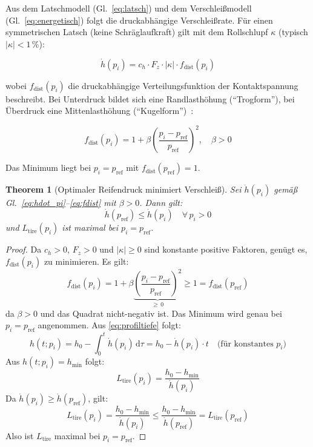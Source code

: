 ﻿\documentclass[12pt,a4paper]{article}
\newtheorem{theorem}{Theorem}[section]
\theoremstyle{definition}
\theoremstyle{remark}
\newcommand{\Ltire}{L_{\mathrm{tire}}}
\newcommand{\pref}{p_{\mathrm{ref}}}
\newcommand{\Fz}{F_z}
\begin{document}
Aus dem Latschmodell (Gl.~\ref{eq:latsch}) und dem Verschleißmodell
(Gl.~\ref{eq:energetisch}) folgt die druckabhängige Verschleißrate.
Für einen symmetrischen Latsch (keine Schräglaufkraft) gilt mit dem
Rollschlupf $\kappa$ (typisch $|\kappa| < 1$\,\%):

\begin{equation}
  \dot{h}(p_i) = c_h \cdot \Fz \cdot |\kappa| \cdot f_{\mathrm{dist}}(p_i)
  \label{eq:hdot_pi}
\end{equation}

wobei $f_{\mathrm{dist}}(p_i)$ die druckabhängige Verteilungsfunktion der
Kontaktspannung beschreibt. Bei Unterdruck bildet sich eine Randlasthöhung
(``Trogform''), bei Überdruck eine Mittenlasthöhung (``Kugelform'')~\cite{Gent2006}:

\begin{equation}
  f_{\mathrm{dist}}(p_i) = 1 + \beta \left(\frac{p_i - \pref}{\pref}\right)^2,
  \quad \beta > 0
  \label{eq:fdist}
\end{equation}

Das Minimum liegt bei $p_i = \pref$ mit $f_{\mathrm{dist}}(\pref) = 1$.

\begin{theorem}[Optimaler Reifendruck minimiert Verschleiß]
\label{thm:pressure}
Sei $\dot{h}(p_i)$ gemäß Gl.~\eqref{eq:hdot_pi}--\eqref{eq:fdist} mit
$\beta > 0$. Dann gilt:
\begin{equation}
  \dot{h}(\pref) \leq \dot{h}(p_i) \quad \forall\, p_i > 0
  \label{eq:thm_pressure}
\end{equation}
und $\Ltire(p_i)$ ist maximal bei $p_i = \pref$.
\end{theorem}

\begin{proof}
Da $c_h > 0$, $\Fz > 0$ und $|\kappa| \geq 0$ sind konstante positive Faktoren,
genügt es, $f_{\mathrm{dist}}(p_i)$ zu minimieren.
Es gilt:
\begin{equation}
  f_{\mathrm{dist}}(p_i) = 1 + \beta \underbrace{\left(\frac{p_i - \pref}{\pref}\right)^2}_{\geq\, 0}
  \geq 1 = f_{\mathrm{dist}}(\pref)
\end{equation}
da $\beta > 0$ und das Quadrat nicht-negativ ist. Das Minimum wird genau bei
$p_i = \pref$ angenommen. Aus \eqref{eq:profiltiefe} folgt:
\begin{equation}
  h(t; p_i) = h_0 - \int_0^t \dot{h}(p_i)\,\mathrm{d}\tau
            = h_0 - \dot{h}(p_i) \cdot t
  \quad\text{(für konstantes $p_i$)}
\end{equation}
Aus $h(t; p_i) = h_{\min}$ folgt:
\begin{equation}
  \Ltire(p_i) = \frac{h_0 - h_{\min}}{\dot{h}(p_i)}
\end{equation}
Da $\dot{h}(p_i) \geq \dot{h}(\pref)$, gilt:
\begin{equation}
  \Ltire(p_i) = \frac{h_0 - h_{\min}}{\dot{h}(p_i)}
              \leq \frac{h_0 - h_{\min}}{\dot{h}(\pref)} = \Ltire(\pref)
\end{equation}
Also ist $\Ltire$ maximal bei $p_i = \pref$.
\end{proof}
\end{document}
